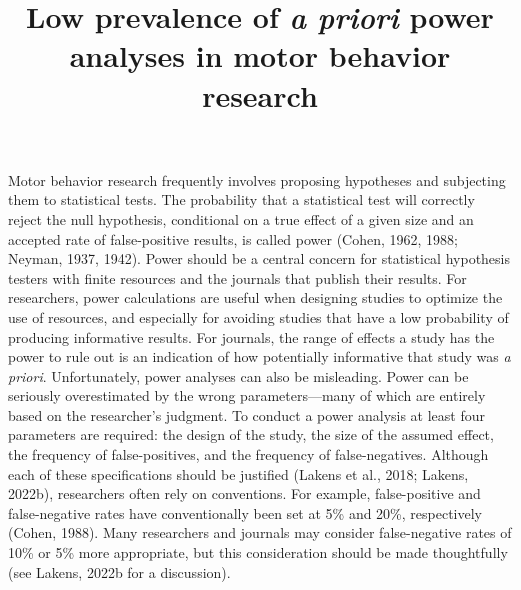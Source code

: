 \documentclass[
  man, donotrepeattitle,mask,floatsintext]{apa7}
\title{Low prevalence of \emph{a priori} power analyses in motor behavior research}
\author{\phantom{0}}
\date{}
\affiliation{\phantom{0}}
\begin{document}
\maketitle

Motor behavior research frequently involves proposing hypotheses and subjecting them to statistical tests. The probability that a statistical test will correctly reject the null hypothesis, conditional on a true effect of a given size and an accepted rate of false-positive results, is called power (Cohen, 1962, 1988; Neyman, 1937, 1942). Power should be a central concern for statistical hypothesis testers with finite resources and the journals that publish their results. For researchers, power calculations are useful when designing studies to optimize the use of resources, and especially for avoiding studies that have a low probability of producing informative results. For journals, the range of effects a study has the power to rule out is an indication of how potentially informative that study was \emph{a priori}. Unfortunately, power analyses can also be misleading. Power can be seriously overestimated by the wrong parameters---many of which are entirely based on the researcher's judgment. To conduct a power analysis at least four parameters are required: the design of the study, the size of the assumed effect, the frequency of false-positives, and the frequency of false-negatives. Although each of these specifications should be justified (Lakens et al., 2018; Lakens, 2022b), researchers often rely on conventions. For example, false-positive and false-negative rates have conventionally been set at 5\% and 20\%, respectively (Cohen, 1988). Many researchers and journals may consider false-negative rates of 10\% or 5\% more appropriate, but this consideration should be made thoughtfully (see Lakens, 2022b for a discussion).
\end{document}
